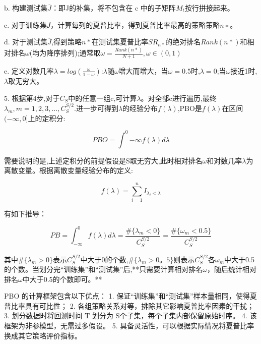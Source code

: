 \documentclass{scrartcl}
\numberwithin{equation}{section}   %
\begin{document}
    b. 构建测试集$\overline{J}$：即J的补集，将不包含在 c 中的子矩阵$𝑀_𝑡$按行拼接起来。
    
    c. 对于训练集𝐽，计算每列的夏普比率，得到夏普比率最高的策略策略$𝑛∗$。
    
    d. 对于测试集$\overline{J}$,得到策略$n*$在测试集夏普比率$SR_{n*}$的绝对排名$Rank(n*)$和相对排名$\omega$(均为降序排列);通常取$\omega=\frac{Rank(n*)}{N+1},\omega\in(0,1)$
    
    e. 定义对数几率$\lambda=log(\frac{\omega}{1-\omega})$:$\lambda$随$\omega$增大而增大，当$\omega=0.5$时,$\lambda=0$;当$\omega$接近1时,$\lambda$取无穷大。

5. 根据第4步,对于$C_S$中的任意一组c,可计算$\lambda$。对全部c进行遍历,最终$\lambda_m,m=1,2,3,\dots,C^{S/2}_S$.进一步可得到$\lambda$的经验分布$f(\lambda)$,PBO是$f(\lambda)$在区间$(-\infty,0]$上的定积分:

$$PBO=\int^{0}{-\infty}f(\lambda)d\lambda$$

需要说明的是,上述定积分的前提假设是S取无穷大,此时相对排名$\omega$和对数几率$\lambda$为离散变量。根据离散变量经验分布的定义:

$$f(\lambda)=\sum^{n}_{i=1}I_{\lambda_i<\lambda}$$

有如下推导：

$$PB=\int^{0}_{-\infty}f(\lambda)d\lambda=\frac{\#\{\lambda_m<0\}}{C^{S/2}_{S}}=\frac{\#\{\omega_m<0.5\}}{C^{S/2}_{S}}$$

其中$\#\{\lambda_m>0\}$表示$C^{S/2}_{S}$中大于0的个数,$\#\{\lambda_m>0。5\}$则表示$C^{S/2}_{S}$各$\omega_m$中大于0.5的个数。当划分完“训练集”和“测试集”后,**只需要计算相对排名$\omega$，随后统计相对排名$\omega$中大于0.5的个数即可。**


PBO 的计算框架包含以下优点： 
1. 保证“训练集”和“测试集”样本量相同，使得夏普比率具有可比性； 
2. 各组策略关系对等，排除其它影响夏普比率因素的干扰； 
3. 划分数据时将回测时间 T 划分为 S个子集，每个子集内部保留原始时序。 
4. 该框架为非参模型，无需过多假设。
5. 具备灵活性，可以根据实际情况将夏普比率换成其它策略评价指标。
\end{document}
